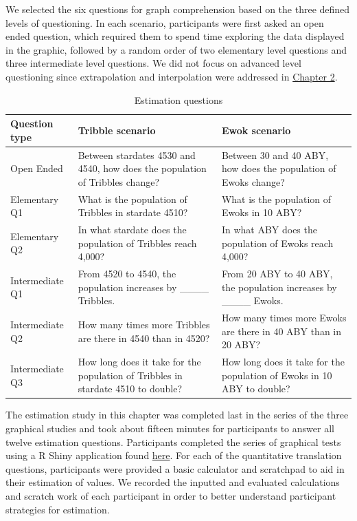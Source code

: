 \documentclass[print]{nuthesis}
\begin{document}
We selected the six questions  for graph comprehension based on the three defined levels of questioning.
In each scenario, participants were first asked an open ended question, which required them to spend time exploring the data displayed in the graphic, followed by a random order of two elementary level questions and three intermediate level questions.
We did not focus on advanced level questioning since extrapolation and interpolation were addressed in \protect\hyperlink{youdrawit}{Chapter 2}.

\begin{table}

\caption{\label{tab:estimation-questions-table}Estimation questions}
\centering
\begin{tabular}[t]{l>{\raggedright\arraybackslash}p{10em}>{\raggedright\arraybackslash}p{10em}}
\toprule
Question type & Tribble scenario & Ewok scenario\\
\midrule
Open Ended & Between stardates 4530 and 4540, how does the population of Tribbles change? & Between 30 and 40 ABY, how does the population of Ewoks change?\\
Elementary Q1 & What is the population of Tribbles in stardate 4510? & What is the population of Ewoks in 10 ABY?\\
Elementary Q2 & In what stardate does the population of Tribbles reach 4,000? & In what ABY does the population of Ewoks reach 4,000?\\
Intermediate Q1 & From 4520 to 4540, the population increases by \_\_\_\_ Tribbles. & From 20 ABY to 40 ABY, the population increases by \_\_\_\_ Ewoks.\\
Intermediate Q2 & How many times more Tribbles are there in 4540 than in 4520? & How many times more Ewoks are there in 40 ABY than in 20 ABY?\\
\addlinespace
Intermediate Q3 & How long does it take for the population of Tribbles in stardate 4510 to double? & How long does it take for the population of Ewoks in 10 ABY to double?\\
\bottomrule
\end{tabular}
\end{table}

The estimation study in this chapter was completed last in the series of the three graphical studies and took about fifteen minutes for participants to answer all twelve estimation questions.
Participants completed the series of graphical tests using a R Shiny application found \href{https://shiny.srvanderplas.com/perception-of-statistical-graphics/}{here}.
For each of the quantitative translation questions, participants were provided a basic calculator and scratchpad to aid in their estimation of values.
We recorded the inputted and evaluated calculations and scratch work of each participant in order to better understand participant strategies for estimation.
\end{document}
